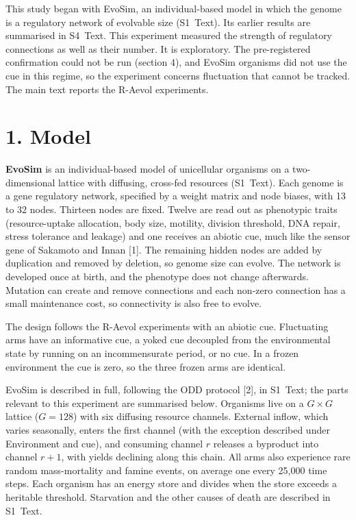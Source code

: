


This study began with EvoSim, an individual-based model in which the genome is a
regulatory network of evolvable size (S1~Text). Its earlier results are
summarised in S4~Text. This experiment measured the strength of
regulatory connections as well as their number. It is exploratory. The
pre-registered confirmation could not be run (section 4), and EvoSim organisms
did not use the cue in this regime, so the experiment concerns fluctuation that
cannot be tracked. The main text reports the R-Aevol experiments.

\section*{1. Model}
\textbf{EvoSim} is an individual-based model of unicellular organisms on a
two-dimensional lattice with diffusing, cross-fed resources (S1~Text). Each genome is a gene regulatory network,
specified by a weight matrix and node biases, with 13 to 32 nodes. Thirteen
nodes are fixed. Twelve are read out as phenotypic traits (resource-uptake
allocation, body size, motility, division threshold, DNA repair, stress
tolerance and leakage) and one receives an abiotic cue, much like the sensor gene
of Sakamoto and Innan [1]. The remaining hidden
nodes are added by duplication and removed by deletion, so genome size can
evolve. The network is developed once at birth, and the phenotype does not
change afterwards. Mutation can create and remove connections and each non-zero
connection has a small maintenance cost, so connectivity is also free to evolve.

The design follows the R-Aevol experiments with an abiotic cue. Fluctuating
arms have an informative cue, a yoked cue decoupled from the environmental state
by running on an incommensurate period, or no cue. In a frozen environment the
cue is zero, so the three frozen arms are identical.

EvoSim is described in full, following the ODD protocol [2], in S1~Text; the
parts relevant to this experiment are summarised below. Organisms live on a
$G\times G$ lattice ($G=128$) with six diffusing resource channels. External
inflow, which varies seasonally, enters the first channel (with the exception
described under Environment and cue), and consuming channel $r$ releases a
byproduct into channel $r+1$, with yields declining along this chain. All arms
also experience rare random mass-mortality and famine events, on average one
every 25{,}000 time steps. Each organism
has an energy store and divides when the store exceeds a heritable threshold.
Starvation and the other causes of death are described in S1~Text.

